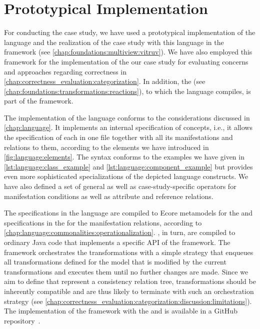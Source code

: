 \section{Prototypical Implementation}

For conducting the case study, we have used a prototypical implementation of the \commonalities language and the realization of the case study with this language in the \vitruv framework (see \autoref{chap:foundations:multiview:vitruv}).
We have also employed this framework for the implementation of the our case study for evaluating concerns and approaches regarding correctness in \autoref{chap:correctness_evaluation:categorization}.
In addition, the \reactionslanguage (see \autoref{chap:foundations:transformations:reactions}), to which the \commonalities language compiles, is part of the \vitruv framework.

The implementation of the \commonalities language conforms to the considerations discussed in \autoref{chap:language}.
It implements an internal specification of concepts, i.e., it allows the specification of each \commonality in one file together with all its manifestations and relations to them, according to the elements we have introduced in \autoref{fig:language:elements}.
The syntax conforms to the examples we have given in \autoref{lst:language:class_example} and \autoref{lst:language:component_example} but provides even more sophisticated specializations of the depicted language constructs.
We have also defined a set of general as well as case-study-specific operators for manifestation conditions as well as attribute and reference relations.

The specifications in the \commonalities language are compiled to Ecore metamodels for the \conceptmetamodels and specifications in the \reactionslanguage for the manifestation relations, according to \autoref{chap:language:commonalities:operationalization}.
\reactions, in turn, are compiled to ordinary Java code that implements a specific \gls{API} of the \vitruv framework.
The framework orchestrates the transformations with a simple strategy that enqueues all transformations defined for the model that is modified by the current transformations and executes them until no further changes are made.
Since we aim to define \commonalities that represent a consistency relation tree, transformations should be inherently compatible and are thus likely to terminate with such an orchestration strategy (see \autoref{chap:correctness_evaluation:categorization:discussion:limitations}).
The implementation of the framework with the \commonalities and \reactionslanguage is available in a GitHub repository~.



